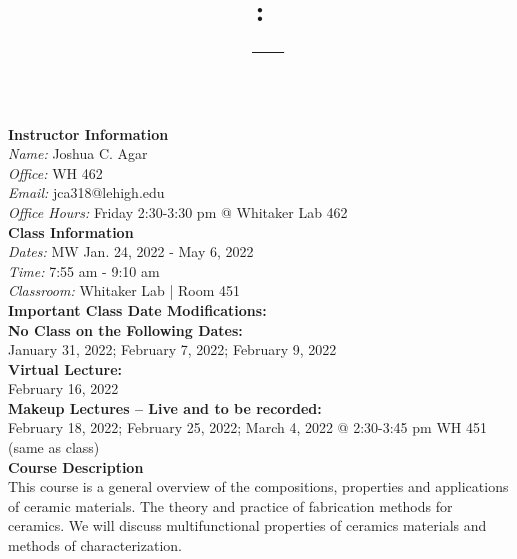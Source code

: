 \documentclass[11pt,letterpaper]{article}
\title{\Large\bfseries \coursecode: \coursetitle \\[0.1cm] \coursesection\ --- \semester}
\author{}
\date{}
\makeatletter
\newcommand{\lefthead}[2]{\noindent\textbf{#1}\hfill\\[#2]}
\newcommand{\instructor}{Joshua C. Agar}
\newcommand{\office}{WH 462}
\newcommand{\email}{jca318@lehigh.edu}
\newcommand{\officehours}{Friday 2:30-3:30 pm @ Whitaker Lab 462}
\newcommand{\coursesupervisor}{SUPERVISOR}
\newcommand{\classdates}{MW Jan. 24, 2022 - May 6, 2022}
\newcommand{\classtime}{7:55 am - 9:10 am}
\newcommand{\classroom}{Whitaker Lab | Room 451}
\makeatother
\begin{document}
\maketitle
\thispagestyle{empty}
\vspace{-2cm}


\lefthead{Instructor Information}{0.3cm}
\indent \emph{Name:} \instructor \\
\indent \emph{Office:} \office \\
\indent \emph{Email:} \email \\
\indent \emph{Office Hours:} \officehours \\


\lefthead{Class Information}{0.3cm}
\indent \emph{Dates: } \classdates \\
\indent \emph{Time: } \classtime \\
\indent \emph{Classroom: } \classroom \\[0.3cm]


\lefthead{Important Class Date Modifications:}{0.3cm}
\noindent \textbf{No Class on the Following Dates:}\\
January 31, 2022; February 7, 2022; February 9, 2022\\[0.1cm]
\noindent \textbf{Virtual Lecture:} \\
February 16, 2022\\[0.1cm]
\noindent \textbf{Makeup Lectures -- Live and to be recorded:}\\
February 18, 2022; February 25, 2022; March 4, 2022 @ 2:30-3:45 pm WH 451 (same as class)\\[0.3cm]



\lefthead{Course Description}{0.3cm}
\noindent This course is a general overview of the compositions, properties and applications of ceramic materials. The theory and practice of fabrication methods for ceramics. We will discuss multifunctional properties of ceramics materials and methods of characterization.\newline
\end{document}
